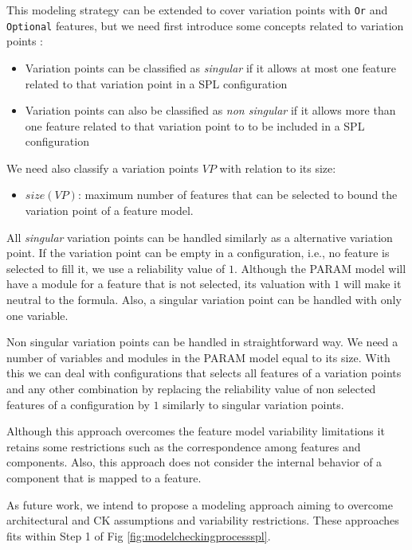 \documentclass[conference]{IEEEtran}
\begin{document}
	This modeling strategy can be extended to cover variation points
	with \texttt{Or} and \texttt{Optional} features, but we need first introduce
	some concepts related to variation points  \cite{czarnecki}:
	
	\begin{itemize}
	 \item Variation points can be classified as \textit{singular} if it allows at most one feature related
	  to that variation point in a SPL configuration
	  \item Variation points can also be classified as \textit{non singular} if it allows 
	  more than one feature related to that variation point to to be included
	  in a SPL configuration
	\end{itemize}
	
	 We need also classify a variation points $VP$  with relation to its size:
	  
	\begin{itemize}
	   \item $size(VP)$: maximum number
	    of features that can be selected to bound the variation point  of a feature model.
	\end{itemize}
	
	All \textit{singular} variation points can be handled similarly as a alternative variation point.
	If the variation point can be empty in a configuration, i.e., no feature is selected to fill it,
	we use a reliability value of $1$. Although the PARAM model will have a module for a
	feature that is not selected, its valuation with $1$ will make it neutral to the formula.
	Also, a singular variation point can be handled with only one variable.
	
	Non singular variation points can be handled in straightforward way. We need a number of variables
	and modules in the PARAM model equal to its size. With this we can deal with
	configurations that selects all features of a variation points and any other combination by
	replacing the reliability value of non selected features of a configuration by $1$ similarly to
	singular variation points.
	
	Although this approach overcomes the feature model variability limitations
	it retains some restrictions such as the correspondence among features and components.
	Also, this approach does not consider the internal behavior  of a component that is mapped
	to a feature.
	
	As future work, we intend to propose a modeling approach aiming to
	overcome architectural and CK assumptions and variability restrictions.
	These approaches fits within Step 1 of Fig \ref{fig:modelcheckingprocessspl}.
		
\end{document}

